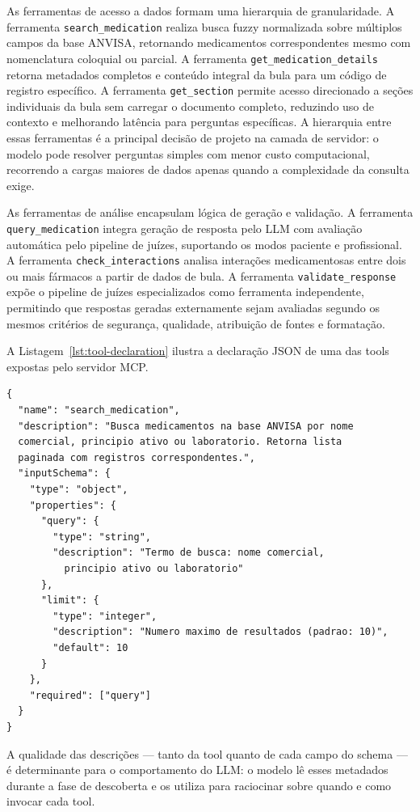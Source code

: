 \documentclass[12pt]{article}
\begin{document}
As ferramentas de acesso a dados formam uma hierarquia de granularidade. A ferramenta \texttt{search\_medication} realiza busca fuzzy normalizada sobre múltiplos campos da base ANVISA, retornando medicamentos correspondentes mesmo com nomenclatura coloquial ou parcial. A ferramenta \texttt{get\_medication\_details} retorna metadados completos e conteúdo integral da bula para um código de registro específico. A ferramenta \texttt{get\_section} permite acesso direcionado a seções individuais da bula sem carregar o documento completo, reduzindo uso de contexto e melhorando latência para perguntas específicas. A hierarquia entre essas ferramentas é a principal decisão de projeto na camada de servidor: o modelo pode resolver perguntas simples com menor custo computacional, recorrendo a cargas maiores de dados apenas quando a complexidade da consulta exige.

As ferramentas de análise encapsulam lógica de geração e validação. A ferramenta \texttt{query\_medication} integra geração de resposta pelo LLM com avaliação automática pelo pipeline de juízes, suportando os modos paciente e profissional. A ferramenta \texttt{check\_interactions} analisa interações medicamentosas entre dois ou mais fármacos a partir de dados de bula. A ferramenta \texttt{validate\_response} expõe o pipeline de juízes especializados como ferramenta independente, permitindo que respostas geradas externamente sejam avaliadas segundo os mesmos critérios de segurança, qualidade, atribuição de fontes e formatação.

A Listagem~\ref{lst:tool-declaration} ilustra a declaração JSON de uma das tools expostas pelo servidor MCP.

\begin{lstlisting}[caption={Declaração JSON de uma tool MCP para busca de medicamentos}, label={lst:tool-declaration}]
{
  "name": "search_medication",
  "description": "Busca medicamentos na base ANVISA por nome
  comercial, principio ativo ou laboratorio. Retorna lista
  paginada com registros correspondentes.",
  "inputSchema": {
    "type": "object",
    "properties": {
      "query": {
        "type": "string",
        "description": "Termo de busca: nome comercial,
          principio ativo ou laboratorio"
      },
      "limit": {
        "type": "integer",
        "description": "Numero maximo de resultados (padrao: 10)",
        "default": 10
      }
    },
    "required": ["query"]
  }
}
\end{lstlisting}

A qualidade das descrições --- tanto da tool quanto de cada campo do schema --- é determinante para o comportamento do LLM: o modelo lê esses metadados durante a fase de descoberta e os utiliza para raciocinar sobre quando e como invocar cada tool.
\end{document}
